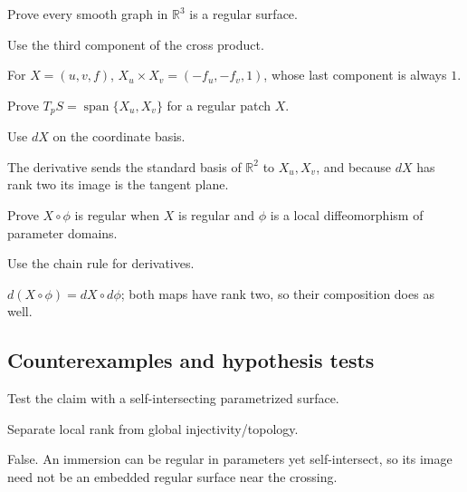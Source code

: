 \begin{exercise}\label{exr:vii14-ped-07}
Prove every smooth graph in \(\mathbb R^3\) is a regular surface.
\end{exercise}
\begin{hint}
Use the third component of the cross product.
\end{hint}
\begin{solution}
For \(X=(u,v,f)\), \(X_u\times X_v=(-f_u,-f_v,1)\), whose last component is always \(1\).
\end{solution}

\begin{exercise}\label{exr:vii14-ped-08}
Prove \(T_pS=\operatorname{span}\{X_u,X_v\}\) for a regular patch \(X\).
\end{exercise}
\begin{hint}
Use \(dX\) on the coordinate basis.
\end{hint}
\begin{solution}
The derivative sends the standard basis of \(\mathbb R^2\) to \(X_u,X_v\), and because \(dX\) has rank two its image is the tangent plane.
\end{solution}

\begin{exercise}\label{exr:vii14-ped-09}
Prove \(X\circ\phi\) is regular when \(X\) is regular and \(\phi\) is a local diffeomorphism of parameter domains.
\end{exercise}
\begin{hint}
Use the chain rule for derivatives.
\end{hint}
\begin{solution}
\(d(X\circ\phi)=dX\circ d\phi\); both maps have rank two, so their composition does as well.
\end{solution}

\subsection*{Counterexamples and hypothesis tests}

\begin{exercise}\label{exr:vii14-ped-10}
Test the claim with a self-intersecting parametrized surface.
\end{exercise}
\begin{hint}
Separate local rank from global injectivity/topology.
\end{hint}
\begin{solution}
False.  An immersion can be regular in parameters yet self-intersect, so its image need not be an embedded regular surface near the crossing.
\end{solution}

